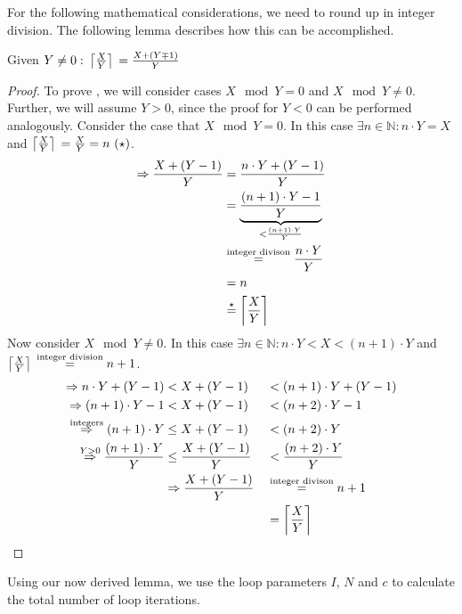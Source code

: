 For the following mathematical considerations, we need to round up in integer division.
The following lemma describes how this can be accomplished.
\begin{lem}\label{lem:impl:fixup:duff:ceil-mp}
    Given $Y \neq 0: \medspace \left\lceil{}\frac{X}{Y}\right\rceil{} = \frac{X + (Y \mp 1)}{Y}$
\end{lem}

\begin{proof}
    To prove , we will consider cases $X \mod Y = 0$ and $X \mod Y \neq 0$.
    Further, we will assume $Y > 0$, since the proof for $Y < 0$ can be performed analogously.
    Consider the case that $X \mod Y = 0$.
    In this case $\exists n \in \mathbb{N}: n \cdot Y = X$ and $\left\lceil{}\frac{X}{Y}\right\rceil{} = \frac{X}{Y} = n~(\star)$.
    \begin{align*}
        \Rightarrow \frac{X + (Y - 1)}{Y} &= \frac{n \cdot Y + (Y - 1)}{Y}\\
        &=\underbrace{\frac{(n + 1) \cdot Y - 1}{Y}}_{< \frac{(n + 1) \cdot Y}{Y}}\\
        &\overset{\text{integer divison}}{=} \frac{n \cdot Y}{Y}\\
        &= n\\
        &\overset{\star}{=} \left\lceil{}\frac{X}{Y}\right\rceil{}
    \end{align*}
    Now consider $X \mod Y \neq 0$.
    In this case $\exists n \in \mathbb{N}: n \cdot Y < X < (n + 1) \cdot Y$ and $\left\lceil{}\frac{X}{Y}\right\rceil{} \overset{\text{integer division}}{=} n + 1$.
    \begin{alignat*}{2}
        \Rightarrow n \cdot Y + (Y - 1) &< X + (Y - 1) &&< (n + 1) \cdot Y + (Y - 1)\\
        \Rightarrow (n + 1) \cdot Y - 1&< X + (Y - 1) &&< (n + 2) \cdot Y - 1\\
        \overset{\text{integers}}{\Rightarrow}  (n + 1) \cdot Y &\leq X + (Y - 1) &&< (n + 2) \cdot Y\\
        \overset{Y > 0}{\Rightarrow} \frac{(n + 1) \cdot Y}{Y} &\leq \frac{X + (Y - 1)}{Y} &&< \frac{(n + 2) \cdot Y}{Y}\\
        &\Rightarrow \frac{X + (Y - 1)}{Y} &&\overset{\text{integer divison}}= n + 1\\
        & &&= \left\lceil{}\frac{X}{Y}\right\rceil{}
    \end{alignat*}
\end{proof}

Using our now derived lemma, we use the loop parameters $I$, $N$ and $c$ to calculate the total number of loop iterations.

